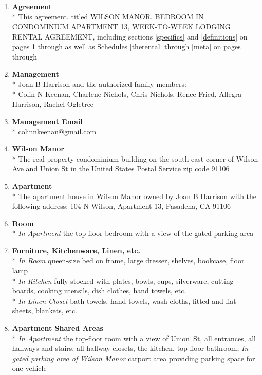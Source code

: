 \documentclass[]{article}
\newcommand{\agreementtitle}{WILSON MANOR, BEDROOM IN CONDOMINIUM APARTMENT 13, WEEK-TO-WEEK LODGING RENTAL AGREEMENT}
\newcommand{\agreementdef}{agreement, titled \agreementtitle{}, including sections \ref{specifics} and \ref{definitions} on pages 1 through \pageref{acceptance} as well as Schedules \ref{therental} through \ref{meta} on pages \pageref{therental} through \pageref{LastPage}}
\newcommand{\mom}{Joan B Harrison}
\newcommand{\management}{Management}
\newcommand{\myemail}{Management Email}
\newcommand{\condo}{Wilson Manor}
\newcommand{\apt}{Apartment}
\newcommand{\room}{Room}
\newcommand{\furniture}{Furniture, Kitchenware, Linen, etc.}
\newcommand{\shared}{Apartment Shared Areas}
\begin{document}
\begin{multicols}{2}
	\begin{enumerate} 
		\item \textbf{Agreement}\\* \label{agreement}
			This \agreementdef{}

			\vfill
			\columnbreak

		\item \textbf{\management{}}\\* \label{management}
			\noindent \mom{}
			and the authorized family members:\\*
			Colin N Keenan,
			Charlene Nichols,
			Chris Nichols,
			Renee Fried,
			Allegra Harrison,
			Rachel Ogletree

		\item \textbf{\myemail{}}\\* \label{myemail}
			colinnkeenan@gmail.com

		\item \textbf{\condo{}}\\* \label{condo}
			The real property condominium building on the south-east corner of Wilson Ave and Union St in the United States Postal Service zip code 91106

		\item \textbf{\apt{}}\\* \label{apt}
			The apartment house in \condo{} owned by \mom{} with the following address:
			104 N Wilson, \apt{} 13,
			Pasadena, CA  91106

		\item \textbf{\room{}}\\* \label{room}
			\textit{In \apt{}}
			the top-floor bedroom with a view of the gated parking area

		\item \textbf{\furniture{}}\\* \label{furniture}
			\textit{In \room{}}
			queen-size bed on frame, large dresser, shelves, bookcase, floor lamp\\*
			\textit{In Kitchen}
			fully stocked with plates, bowls, cups, silverware, cutting boards, cooking utensils, dish clothes, hand towels, etc.\\*
			\textit{In Linen Closet}
			bath towels, hand towels, wash cloths, fitted and flat sheets, blankets, etc.

		\item \textbf{\shared{}}\\* \label{shared}
			\textit{In \apt{}}
			the top-floor room with a view of Union~St,
			all entrances,
			all hallways and stairs,
			all hallway closets,
			the kitchen,
			top-floor bathroom,
			\textit{In gated parking area of \condo{}}
			carport area providing parking space for one vehicle
			

\end{enumerate}
\end{multicols}
\end{document}
